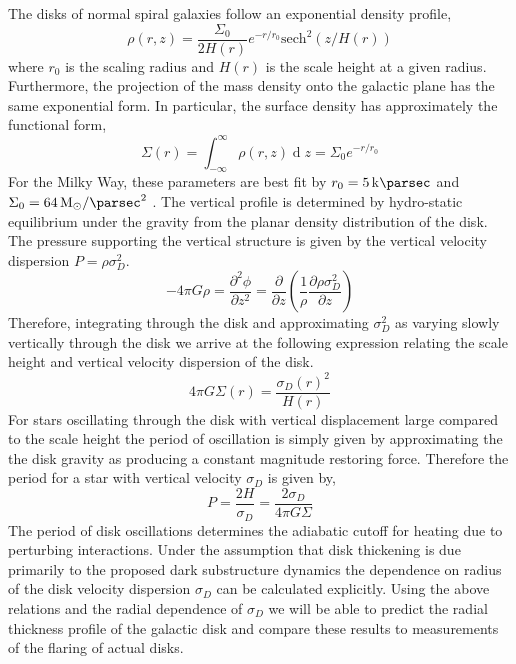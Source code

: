 \documentclass[usenatbib]{mnras}
\renewcommand{\d}[1]{\! \mathrm{d}#1 \:}
\newcommand{\pderiv}[2]{\frac{\partial{#1}}{\partial{#2}}}
\renewcommand{\d}[1]{\ensuremath{\operatorname{d}\!{#1}}}
\begin{document}
\par
The disks of normal spiral galaxies follow an exponential density profile,
\begin{equation}
\rho(r, z) = \frac{\Sigma_0}{2 H(r)} e^{-r/r_0} \mathrm{sech}^2{(z/H(r))} 
\end{equation}
where $r_0$ is the scaling radius and $H(r)$ is the scale height at a given radius. Furthermore, the projection of the mass density onto the galactic plane has the same exponential form. In particular, the surface density has approximately the functional form,
\begin{equation}
\Sigma(r) = \int_{-\infty}^{\infty} \rho(r, z) \d{z} = \Sigma_0 e^{-r / r_0}
\end{equation}
For the Milky Way, these parameters are best fit by $r_0 = \SI{5}{\kilo \parsec}$ and $\Sigma_0 = \SI{64}{M_{\odot} \per \parsec \squared}$ \citep{dynamical_measurement}. The vertical profile is determined by hydro-static equilibrium under the gravity from the planar density distribution of the disk. The pressure supporting the vertical structure is given by the vertical velocity dispersion $P = \rho \sigma_D^2$. 
\begin{equation}
- 4 \pi G \rho = \frac{\partial^2 \phi}{\partial z^2} = \pderiv{}{z} \left( \frac{1}{\rho} \pderiv{ \rho \sigma_D^2}{z} \right)
\end{equation}  
Therefore, integrating through the disk and approximating $\sigma_D^2$ as varying slowly vertically through the disk we arrive at the following expression relating the scale height and vertical velocity dispersion of the disk.
\begin{equation} \label{scale}
4 \pi G \Sigma(r) = \frac{ \sigma_D(r)^2 }{H(r)}
\end{equation}
For stars oscillating through the disk with vertical displacement large compared to the scale height the period of oscillation is simply given by approximating the the disk gravity as producing a constant magnitude restoring force. Therefore the period for a star with vertical velocity $\sigma_D$ is given by,
\begin{equation}
P = \frac{2 H}{\sigma_D} = \frac{2 \sigma_D}{4 \pi G \Sigma}
\end{equation}
The period of disk oscillations determines the adiabatic cutoff for heating due to perturbing interactions. Under the assumption that disk thickening is due primarily to the proposed dark substructure dynamics the dependence on radius of the disk velocity dispersion $\sigma_D$ can be calculated explicitly. Using the above relations and the radial dependence of $\sigma_D$ we will be able to predict the radial thickness profile of the galactic disk and compare these results to measurements of the flaring of actual disks.  
\end{document}
